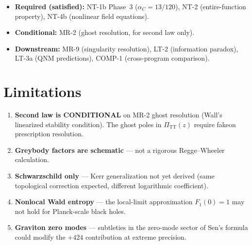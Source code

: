 \documentclass[11pt,a4paper]{article}
\begin{document}
\begin{itemize}[leftmargin=2em]
  \item \textbf{Required (satisfied):} NT-1b Phase~3 ($\alpha_C = 13/120$),
  NT-2 (entire-function property), NT-4b (nonlinear field equations).
  \item \textbf{Conditional:} MR-2 (ghost resolution, for second law only).
  \item \textbf{Downstream:} MR-9 (singularity resolution),
  LT-2 (information paradox), LT-3a (QNM predictions),
  COMP-1 (cross-program comparison).
\end{itemize}

\section{Limitations}

\begin{enumerate}
  \item \textbf{Second law is CONDITIONAL} on MR-2 ghost resolution
  (Wall's linearized stability condition). The ghost poles in
  $\Pi_{\mathrm{TT}}(z)$ require fakeon prescription resolution.
  \item \textbf{Greybody factors are schematic} ---
  not a rigorous Regge--Wheeler calculation.
  \item \textbf{Schwarzschild only} --- Kerr generalization not yet derived
  (same topological correction expected, different logarithmic coefficient).
  \item \textbf{Nonlocal Wald entropy} --- the local-limit approximation
  $F_1(0) = 1$ may not hold for Planck-scale black holes.
  \item \textbf{Graviton zero modes} --- subtleties in the zero-mode
  sector of Sen's formula could modify the $+424$ contribution
  at extreme precision.
\end{enumerate}
\end{document}
